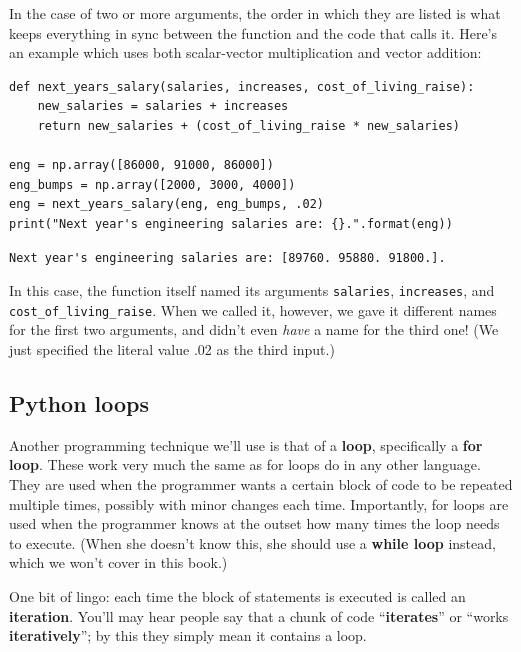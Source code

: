 In the case of two or more arguments, the order in which they are listed is
what keeps everything in sync between the function and the code that calls it.
Here's an example which uses both scalar-vector multiplication and vector
addition:

\begin{Verbatim}[fontsize=\footnotesize,samepage=true,frame=single,framesep=3mm]
def next_years_salary(salaries, increases, cost_of_living_raise):
    new_salaries = salaries + increases
    return new_salaries + (cost_of_living_raise * new_salaries)

eng = np.array([86000, 91000, 86000])
eng_bumps = np.array([2000, 3000, 4000])
eng = next_years_salary(eng, eng_bumps, .02)
print("Next year's engineering salaries are: {}.".format(eng))
\end{Verbatim}
\vspace{-.2in}

\begin{Verbatim}[fontsize=\footnotesize,samepage=true,frame=leftline,framesep=5mm,framerule=1mm]
Next year's engineering salaries are: [89760. 95880. 91800.].
\end{Verbatim}

In this case, the function itself named its arguments \texttt{salaries},
\texttt{increases}, and \texttt{cost\_of\_living\_raise}. When we called it,
however, we gave it different names for the first two arguments, and didn't
even \textit{have} a name for the third one! (We just specified the literal
value .02 as the third input.)

\subsection*{Python loops}


Another programming technique we'll use is that of a \textbf{loop},
specifically a \textbf{for loop}. These work very much the same as for loops do
in any other language. They are used when the programmer wants a certain block
of code to be repeated multiple times, possibly with minor changes each time.
Importantly, for loops are used when the programmer knows at the outset how
many times the loop needs to execute. (When she doesn't know this, she should
use a \textbf{while loop} instead, which we won't cover in this book.)

One bit of lingo: each time the block of statements is executed is called an
\textbf{iteration}. You'll may hear people say that a chunk of code
``\textbf{iterates}'' or ``works \textbf{iteratively}''; by this they simply
mean it contains a loop.

